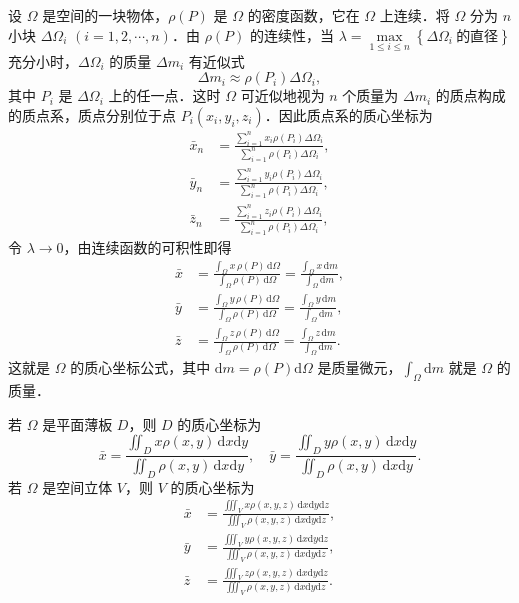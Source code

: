 设 $\Omega$ 是空间的一块物体，$\rho(P)$ 是 $\Omega$ 的密度函数，它在 $\Omega$ 上连续．将 $\Omega$ 分为 $n$ 小块 $\Delta\Omega_{i}$ $(i=1,2,\cdots,n)$．由 $\rho(P)$ 的连续性，当 $\lambda=\max\limits_{1\leqslant i\leqslant n}\left\{\Delta\Omega_{i}\ \text{的直径}\right\}$ 充分小时，$\Delta\Omega_{i}$ 的质量 $\Delta m_{i}$ 有近似式
\[
\Delta m_{i}\approx\rho(P_{i})\Delta\Omega_{i},
\]
其中 $P_{i}$ 是 $\Delta\Omega_{i}$ 上的任一点．这时 $\Omega$ 可近似地视为 $n$ 个质量为 $\Delta m_{i}$ 的质点构成的质点系，质点分别位于点 $P_{i}(x_{i},y_{i},z_{i})$．因此质点系的质心坐标为
\[
\begin{aligned}
\bar{x}_{n}&=\frac{\displaystyle\sum_{i=1}^{n}x_{i}\rho(P_{i})\Delta\Omega_{i}}{\displaystyle\sum_{i=1}^{n}\rho(P_{i})\Delta\Omega_{i}},\\
\bar{y}_{n}&=\frac{\displaystyle\sum_{i=1}^{n}y_{i}\rho(P_{i})\Delta\Omega_{i}}{\displaystyle\sum_{i=1}^{n}\rho(P_{i})\Delta\Omega_{i}},\\
\bar{z}_{n}&=\frac{\displaystyle\sum_{i=1}^{n}z_{i}\rho(P_{i})\Delta\Omega_{i}}{\displaystyle\sum_{i=1}^{n}\rho(P_{i})\Delta\Omega_{i}},
\end{aligned}
\]
令 $\lambda\to 0$，由连续函数的可积性即得
\[
\begin{aligned}
\bar{x}&=\frac{\displaystyle\int_{\Omega}x\,\rho(P)\,\mathrm{d}\Omega}{\displaystyle\int_{\Omega}\rho(P)\,\mathrm{d}\Omega}=\frac{\displaystyle\int_{\Omega}x\,\mathrm{d}m}{\displaystyle\int_{\Omega}\mathrm{d}m},\\
\bar{y}&=\frac{\displaystyle\int_{\Omega}y\,\rho(P)\,\mathrm{d}\Omega}{\displaystyle\int_{\Omega}\rho(P)\,\mathrm{d}\Omega}=\frac{\displaystyle\int_{\Omega}y\,\mathrm{d}m}{\displaystyle\int_{\Omega}\mathrm{d}m},\\
\bar{z}&=\frac{\displaystyle\int_{\Omega}z\,\rho(P)\,\mathrm{d}\Omega}{\displaystyle\int_{\Omega}\rho(P)\,\mathrm{d}\Omega}=\frac{\displaystyle\int_{\Omega}z\,\mathrm{d}m}{\displaystyle\int_{\Omega}\mathrm{d}m}.
\end{aligned}
\]
这就是 $\Omega$ 的质心坐标公式，其中 $\mathrm{d}m=\rho(P)\mathrm{d}\Omega$ 是质量微元，$\displaystyle\int_{\Omega}\mathrm{d}m$ 就是 $\Omega$ 的质量．

若 $\Omega$ 是平面薄板 $D$，则 $D$ 的质心坐标为
\[
\bar{x}=\frac{\displaystyle\iint_{D}x\rho(x,y)\,\mathrm{d}x\mathrm{d}y}{\displaystyle\iint_{D}\rho(x,y)\,\mathrm{d}x\mathrm{d}y},\quad
\bar{y}=\frac{\displaystyle\iint_{D}y\rho(x,y)\,\mathrm{d}x\mathrm{d}y}{\displaystyle\iint_{D}\rho(x,y)\,\mathrm{d}x\mathrm{d}y}.
\]
若 $\Omega$ 是空间立体 $V$，则 $V$ 的质心坐标为
\[
\begin{aligned}
\bar{x}&=\frac{\displaystyle\iiint_{V}x\rho(x,y,z)\,\mathrm{d}x\mathrm{d}y\mathrm{d}z}{\displaystyle\iiint_{V}\rho(x,y,z)\,\mathrm{d}x\mathrm{d}y\mathrm{d}z},\\
\bar{y}&=\frac{\displaystyle\iiint_{V}y\rho(x,y,z)\,\mathrm{d}x\mathrm{d}y\mathrm{d}z}{\displaystyle\iiint_{V}\rho(x,y,z)\,\mathrm{d}x\mathrm{d}y\mathrm{d}z},\\
\bar{z}&=\frac{\displaystyle\iiint_{V}z\rho(x,y,z)\,\mathrm{d}x\mathrm{d}y\mathrm{d}z}{\displaystyle\iiint_{V}\rho(x,y,z)\,\mathrm{d}x\mathrm{d}y\mathrm{d}z}.
\end{aligned}
\]

